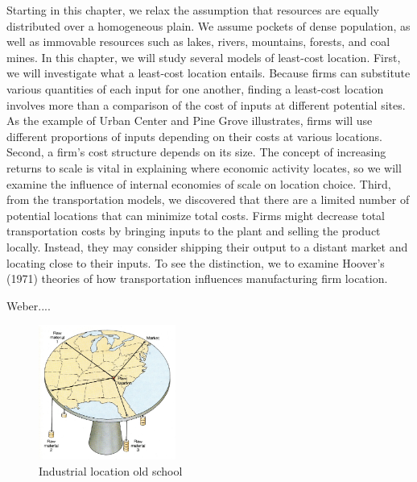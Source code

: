 Starting in this chapter, we relax the assumption that resources are equally distributed over a homogeneous plain. We assume pockets of dense population, as well as immovable resources such as lakes, rivers, mountains, forests, and coal mines. In this chapter, we will study several models of least-cost location. First, we will investigate what a least-cost location entails. Because firms can substitute various quantities of each input for one another, finding a least-cost location involves more than a comparison of the cost of inputs at different potential sites. As the example of Urban Center and Pine Grove illustrates, firms will use different proportions of inputs depending on their costs at various locations. Second, a firm’s cost structure depends on its size. The concept of increasing returns to scale is vital in explaining where economic activity locates, so we will examine the influence of internal economies of scale on location choice. Third, from the transportation models, we discovered that there are a limited number of potential locations that can minimize total costs. Firms might decrease total transportation costs by bringing inputs to the plant and selling the product locally. Instead, they may consider shipping their output to a distant market and locating close to their inputs. To see the distinction, we to examine Hoover’s (1971) theories of how transportation influences manufacturing firm location.




Weber....

\begin{figure}[h!]
    \centering
    \includegraphics[width=0.4\textwidth]{sections/asset/weber1.PNG}
    \caption{Industrial location old school}
    \label{fig:weber}
\end{figure}


